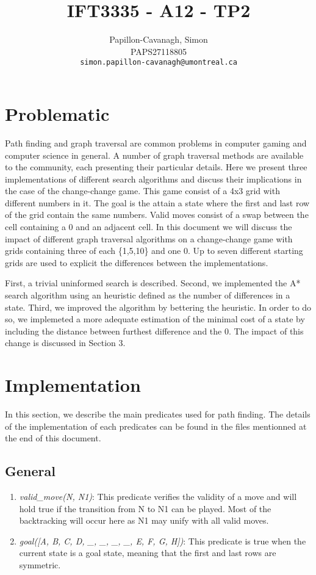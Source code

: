 \documentclass[12pt]{article}
\author{
  Papillon-Cavanagh, Simon\\
  PAPS27118805\\
  \texttt{simon.papillon-cavanagh@umontreal.ca}
}
\title{IFT3335 - A12 - TP2}
\begin{document}
\maketitle


\section{Problematic}
Path finding and graph traversal are common problems in computer gaming and computer science in general.  A number of graph traversal methods are available to the community, each presenting their particular details.  Here we present three implementations of different search algorithms and discuss their implications in the case of the change-change game.  This game consist of a 4x3 grid with different numbers in it. The goal is the attain a state where the first and last row of the grid contain the same numbers.  Valid moves consist of a swap between the cell containing a 0 and an adjacent cell.  In this document we will discuss the impact of different graph traversal algorithms on a change-change game with grids containing three of each \{1,5,10\} and one 0.  Up to seven different starting grids are used to explicit the differences between the implementations.

First, a trivial uninformed search is described.  Second, we implemented the A* search algorithm using an heuristic defined as the number of differences in a state. Third, we improved the algorithm by bettering the heuristic.  In order to do so, we implemeted a more adequate estimation of the minimal cost of a state by including the distance between furthest difference and the 0.  The impact of this change is discussed in Section 3.

\section{Implementation}
In this section, we describe the main predicates used for path finding.  The details of the implementation of each predicates can be found in the files mentionned at the end of this document.

\subsection{General}
\begin{enumerate}[-]
\item
\textit{valid\_move(N, N1)}: This predicate verifies the validity of a move and will hold true if the transition from N to N1 can be played. Most of the backtracking will occur here as N1 may unify with all valid moves.
\item
\textit{goal([A, B, C, D, \_, \_, \_, \_, E, F, G, H])}: This predicate is true when the current state is a goal state, meaning that the first and last rows are symmetric.
\end{enumerate}
\end{document}
